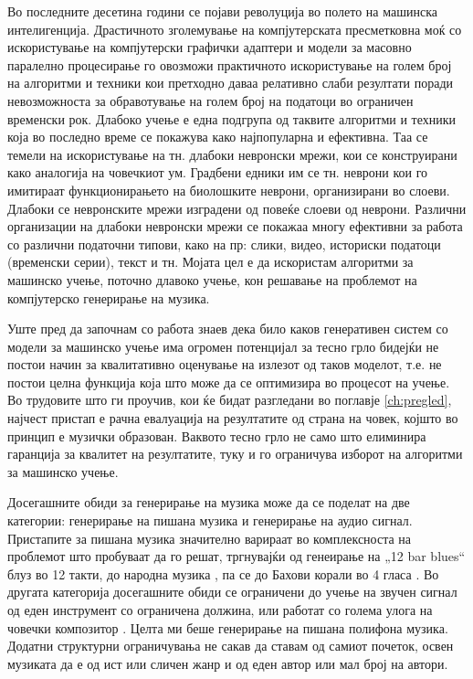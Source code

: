 Во последните десетина години се појави револуција во полето на машинска интелигенција. Драстичното зголемување на компјутерската пресметковна моќ со искористување на компјутерски графички адаптери и модели за масовно паралелно процесирање го овозможи практичното искористување на голем број на алгоритми и техники кои претходно даваа релативно слаби резултати поради невозможноста за обравотување на голем број на податоци во ограничен временски рок. Длабоко учење е една подгрупа од таквите алгоритми и техники која во последно време се покажува како најпопуларна и ефективна. Таа се темели на искористување на тн. длабоки невронски мрежи, кои се конструирани како аналогија на човечкиот ум. Градбени едники им се тн. неврони кои го имитираат функционирањето на биолошките неврони, организирани во слоеви. Длабоки се невронските мрежи изградени од повеќе слоеви од неврони. Различни организации на длабоки невронски мрежи се покажаа многу ефективни за работа со различни податочни типови, како на пр: слики, видео, историски податоци (временски серии), текст и тн. Мојата цел е да искористам алгоритми за машинско учење, поточно длавоко учење, кон решавање на проблемот на компјутерско генерирање на музика.

Уште пред да започнам со работа знаев дека било каков генеративен систем со модели за машинско учење има огромен потенцијал за тесно грло бидејќи не постои начин за квалитативно оценување на излезот од таков моделот, т.е. не постои целна функција која што може да се оптимизира во процесот на учење. Во трудовите што ги проучив, кои ќе бидат разгледани во поглавје \ref{ch:pregled}, најчест пристап е рачна евалуација на резултатите од страна на човек, којшто во принцип е музички образован. Ваквото тесно грло не само што елиминира гаранција за квалитет на резултатите, туку и го ограничува изборот на алгоритми за машинско учење. 

Досегашните обиди за генерирање на музика може да се поделат на две категории: генерирање на пишана музика и генерирање на аудио сигнал. Пристапите за пишана музика значително варираат во комплексноста на проблемот што пробуваат да го решат, тргнувајќи од генеирање на „12 bar blues“ \cite{Eck2002} блуз во 12 такти, до народна музика \cite{Sturm2016}, па се до Бахови корали во 4 гласа \cite{Liang2017,Hadjeres2016}. Во другата категорија досегашните обиди \cite{Oord2016} се ограничени до учење на звучен сигнал од еден инструмент со ограничена должина, или работат со голема улога на човечки композитор \cite{Ghedini2015}. Целта ми беше генерирање на пишана полифона музика. Додатни структурни ограничувања не сакав да ставам од самиот почеток, освен музиката да е од ист или сличен жанр и од еден автор или мал број на автори.

